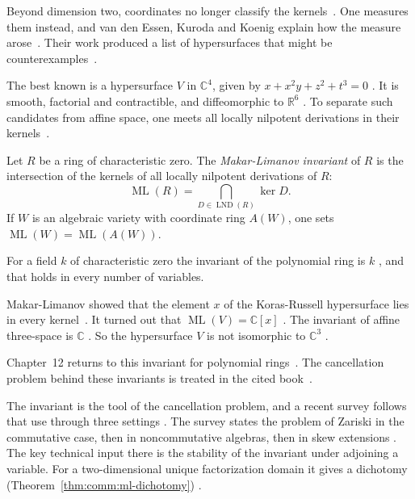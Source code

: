 Beyond dimension two, coordinates no longer classify the
kernels~\cite[p.~65]{VanEssenKurodaKoenig2021}. One measures them instead, and
van den Essen, Kuroda and Koenig explain how the measure
arose~\cite[p.~65]{VanEssenKurodaKoenig2021}. Their work produced a list of
hypersurfaces that might be
counterexamples~\cite[p.~65]{VanEssenKurodaKoenig2021}.

The best known is a hypersurface $V$ in $\mathbb{C}^4$, given by
$x + x^2 y + z^2 + t^3 = 0$
\cite[p.~65]{VanEssenKurodaKoenig2021}. It is smooth, factorial and
contractible, and diffeomorphic to $\mathbb{R}^6$
\cite[p.~65]{VanEssenKurodaKoenig2021}. To separate such candidates from affine
space, one meets all locally nilpotent derivations in their
kernels~\cite[p.~65]{VanEssenKurodaKoenig2021}.

\begin{definition}\label{def:comm:ml}
Let $R$ be a ring of characteristic zero. The \emph{Makar-Limanov invariant}
of $R$ is the intersection of the kernels of all locally nilpotent
derivations of $R$:
\[
\operatorname{ML}(R) = \bigcap_{D \in \operatorname{LND}(R)} \ker D .
\]
If $W$ is an algebraic variety with coordinate ring $A(W)$, one sets
$\operatorname{ML}(W) = \operatorname{ML}(A(W))$.
\end{definition}

For a field $k$ of characteristic zero the invariant of the polynomial ring is
$k$ \cite[Example~3.1.2, p.~66]{VanEssenKurodaKoenig2021}, and that holds in
every number of variables.

Makar-Limanov showed that the element $x$ of the Koras-Russell hypersurface
lies in every kernel~\cite[p.~66]{VanEssenKurodaKoenig2021}. It turned out
that $\operatorname{ML}(V) = \mathbb{C}[x]$
\cite[p.~66]{VanEssenKurodaKoenig2021}. The invariant of affine three-space is
$\mathbb{C}$ \cite[p.~66]{VanEssenKurodaKoenig2021}. So the hypersurface $V$
is not isomorphic to $\mathbb{C}^3$ \cite[p.~66]{VanEssenKurodaKoenig2021}.

Chapter~12 returns to this invariant for polynomial
rings~\cite[p.~65]{VanEssenKurodaKoenig2021}. The cancellation problem behind
these invariants is treated in the cited
book~\cite[p.~65]{VanEssenKurodaKoenig2021}.

The invariant is the tool of the cancellation problem, and a recent survey
follows that use through three settings
\cite[pp.~1--3]{VenegasVenegas2025Cancellation}. The survey states the
problem of Zariski in the commutative case, then in noncommutative algebras,
then in skew extensions \cite[pp.~1--3]{VenegasVenegas2025Cancellation}. The
key technical input there is the stability of the invariant under adjoining a
variable. For a two-dimensional unique factorization domain it gives a
dichotomy (Theorem~\ref{thm:comm:ml-dichotomy}) \cite[Theorem~2.2, p.~7]{VenegasVenegas2025Cancellation}.


